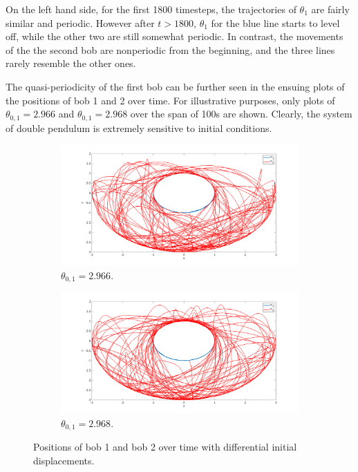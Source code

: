 \documentclass{article}
\begin{document}
On the left hand side, for the first 1800 timesteps, the trajectories of $\theta_1$ are fairly similar and periodic. However after $t > 1800$, $\theta_1$ for the blue line starts to level off, while the other two are still somewhat periodic. In contrast, the movements of the the second bob are nonperiodic from the beginning, and the three lines rarely resemble the other ones. 

The quasi-periodicity of the first bob can be further seen in the ensuing plots of the positions of bob 1 and 2 over time. For illustrative purposes, only plots of $\theta_{0,1} = 2.966$ and $\theta_{0,1} = 2.968$ over the span of 100s are shown. Clearly, the system of double pendulum is extremely sensitive to initial conditions. 

\begin{figure}[!htbp]
  \begin{subfigure}[b]{0.5\textwidth}
    \includegraphics[width=\textwidth]{bob66.png}
    \caption{$\theta_{0,1} = 2.966$.}
    \label{fig:f1}
  \end{subfigure}
  \hfill
  \begin{subfigure}[b]{0.5\textwidth}
    \includegraphics[width=\textwidth]{bob68.png}
    \caption{$\theta_{0,1} = 2.968$.}
    \label{fig:f2}
  \end{subfigure}
  \caption{Positions of bob 1 and bob 2 over time with differential initial displacements.}
\end{figure}
\end{document}
